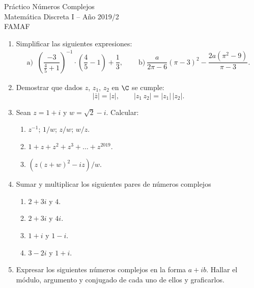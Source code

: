 \documentclass[12pt,spanish,makeidx]{amsbook}
\begin{document}
	
	{\bf \begin{center} Práctico Números Complejos \\ Matemática Discreta I -- Año 2019/2 \\ FAMAF \end{center}}
	
	\smallskip


\begin{enumerate}

\item
Simplificar las siguientes expresiones:
$$\begin{array}{ll}
 \text{a) } \ \left(\dfrac{-3}{\frac{4}{5}+1}\right)^{-1}\cdot\left(\dfrac{4}{5}-1\right) + \dfrac{1}{3}, \quad &
\text{ b)} \ \dfrac{a}{2\pi-6}(\pi-3)^2 -\dfrac{2a(\pi^2-9)}{\pi-3}.
\end{array}$$

\vspace{.5cm}


\item Demostrar que  dados $z$, $z_1$, $z_2$ en $\C$ se cumple:
\[ |\bar z|= |z|, \qquad |z_1 \, z_2|= |z_1| \, |z_2|. \]

\vspace{.5cm}


\item Sean $z=1+i$ y $w=\sqrt{2}-i$. Calcular:
 \begin{enumerate}
  \item $z^{-1}$; $1/w$; $z/w$; $w/z$.

  \item $1+z+z^2+z^3+\dots+z^{2019}$.

  \item $(z(z+w)^2-iz)/w$.
 \end{enumerate}


\vspace{.5cm}


\item Sumar y multiplicar los siguientes pares de números complejos
	\begin{enumerate}
		\item $2+ 3i$ y $4$.
		\item $2+ 3i$ y $4i$.
		\item $1 + i$ y $ 1 -i$.
		\item $3-2i$ y $1 +i$. 
	\end{enumerate}

\vspace{.5cm}


 \item Expresar los siguientes n{\'u}meros complejos en la forma $a +i b$.
 Hallar el m{\'o}dulo, argumento y conjugado de cada uno de ellos y graficarlos.


\end{enumerate}
\end{document}
